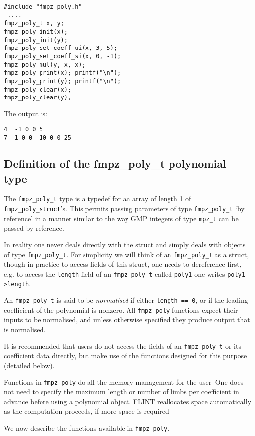 \documentclass[a4paper,10pt]{article}
\newcommand{\code}{\lstinline}
\begin{document}
\begin{lstlisting}
#include "fmpz_poly.h"
 ....
fmpz_poly_t x, y;
fmpz_poly_init(x);
fmpz_poly_init(y);
fmpz_poly_set_coeff_ui(x, 3, 5);
fmpz_poly_set_coeff_si(x, 0, -1);
fmpz_poly_mul(y, x, x);
fmpz_poly_print(x); printf("\n");
fmpz_poly_print(y); printf("\n");
fmpz_poly_clear(x);
fmpz_poly_clear(y);
\end{lstlisting}

The output is:

\begin{lstlisting}
4  -1 0 0 5
7  1 0 0 -10 0 0 25
\end{lstlisting}

\subsection{Definition of the fmpz\_poly\_t polynomial type}

The \code{fmpz_poly_t} type is a typedef for an array of length 1 of \code{fmpz_poly_struct}'s. This permits passing parameters  of type \code{fmpz_poly_t} `by reference' in a manner similar to the way GMP integers of type \code{mpz_t} can be passed by reference. 

In reality one never deals directly with the struct and simply deals with objects of type \code{fmpz_poly_t}. For simplicity we will think of an \code{fmpz_poly_t} as a struct, though in practice to access fields of this struct, one needs to dereference first, e.g. to access the \code{length} field of an \code{fmpz_poly_t} called \code{poly1} one writes \code{poly1->length}. 

An \code{fmpz_poly_t} is said to be \emph{normalised} if either \code{length == 0}, or if the leading coefficient of the polynomial is nonzero. All \code{fmpz_poly} functions expect their inputs to be normalised, and unless otherwise specified they produce output that is normalised. 

It is recommended that users do not access the fields of an \code{fmpz_poly_t} or its coefficient data directly, but make use of the functions designed for this purpose (detailed below).

Functions in \code{fmpz_poly} do all the memory management for the user. One does not need to specify the maximum length or number of limbs per coefficient in advance before using a polynomial object. FLINT reallocates space automatically as the computation proceeds, if more space is required. 

We now describe the functions available in \code{fmpz_poly}.
\end{document}
